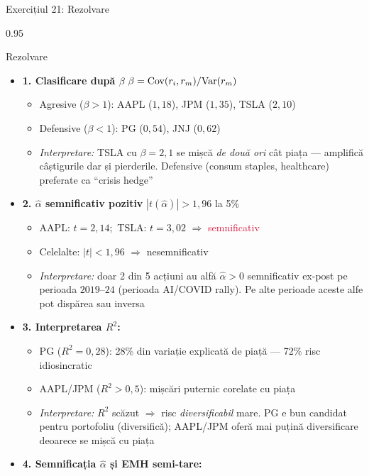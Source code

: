 \documentclass[9pt, aspectratio=169, t]{beamer}
\begin{document}
\begin{frame}[shrink=35]{Exercițiul 21: Rezolvare}
\begin{cminipage}{0.95\textwidth}
\begin{exampleblock}{Rezolvare}
\begin{itemize}\setlength{\itemsep}{0pt}
    \item \textbf{1. Clasificare după $\beta$} \quad $\beta = \text{Cov}(r_i, r_m)/\text{Var}(r_m)$
    \begin{itemize}\setlength{\itemsep}{0pt}
        \item Agresive ($\beta > 1$): AAPL ($1{,}18$), JPM ($1{,}35$), TSLA ($2{,}10$)
        \item Defensive ($\beta < 1$): PG ($0{,}54$), JNJ ($0{,}62$)
        \item \textit{Interpretare:} TSLA cu $\beta = 2{,}1$ se mișcă \emph{de două ori} cât piața --- amplifică câștigurile dar și pierderile. Defensive (consum staples, healthcare) preferate ca ``crisis hedge''
    \end{itemize}
    \item \textbf{2. $\hat\alpha$ semnificativ pozitiv} \quad $|t(\hat\alpha)| > 1{,}96$ la 5\%
    \begin{itemize}\setlength{\itemsep}{0pt}
        \item AAPL: $t = 2{,}14$;\ TSLA: $t = 3{,}02$ $\Rightarrow$ \textcolor{Crimson}{semnificativ}
        \item Celelalte: $|t| < 1{,}96$ $\Rightarrow$ nesemnificativ
        \item \textit{Interpretare:} doar 2 din 5 acțiuni au alfă $\hat\alpha > 0$ semnificativ ex-post pe perioada $2019$--$24$ (perioada AI/COVID rally). Pe alte perioade aceste alfe pot dispărea sau inversa
    \end{itemize}
    \item \textbf{3. Interpretarea $R^2$:}
    \begin{itemize}\setlength{\itemsep}{0pt}
        \item PG ($R^2 = 0{,}28$): 28\% din variație explicată de piață --- 72\% risc idiosincratic
        \item AAPL/JPM ($R^2 > 0{,}5$): mișcări puternic corelate cu piața
        \item \textit{Interpretare:} $R^2$ scăzut $\Rightarrow$ risc \emph{diversificabil} mare. PG e bun candidat pentru portofoliu (diversifică); AAPL/JPM oferă mai puțină diversificare deoarece se mișcă cu piața
    \end{itemize}
    \item \textbf{4. Semnificația $\hat\alpha$ și EMH semi-tare:}

\end{itemize}
\end{exampleblock}
\end{cminipage}
\end{frame}
\end{document}
